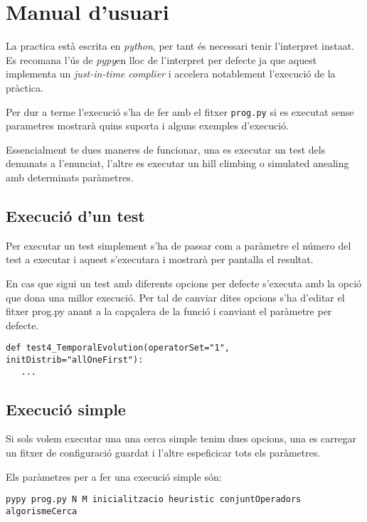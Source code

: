 \section{Manual d'usuari}

La practica està escrita en \emph{python}\footnotemark, per tant és necessari tenir
l'interpret insta\lgem at.
Es recomana l'ús de \emph{pypy}\footnotemark en lloc de l'interpret per defecte ja 
que aquest implementa un \emph{just-in-time complier} i accelera notablement l'execució
de la pràctica.

Per dur a terme l'execució s'ha de fer amb el fitxer \texttt{prog.py} si es executat
sense parametres mostrarà quins suporta i alguns exemples d'execució.

Essencialment te dues maneres de funcionar, una es executar un test dels demanats a l'enunciat,
l'altre es executar un hill climbing o simulated anealing amb determinats paràmetres.

\subsection{Execució d'un test}
Per executar un test simplement s'ha de passar com a paràmetre el número del test a executar i 
aquest s'executara i mostrarà per pantalla el resultat.

En cas que sigui un test amb diferents opcions per defecte s'executa amb la opció que dona
una millor execució. Per tal de canviar dites opcions s'ha d'editar el fitxer prog.py anant
a la capçalera de la funció i canviant el paràmetre per defecte.

\begin{verbatim}
def test4_TemporalEvolution(operatorSet="1", initDistrib="allOneFirst"):
   ...
\end{verbatim}

\subsection{Execució simple}
Si sols volem executar una una cerca simple tenim dues opcions, una es carregar un fitxer de configuració
guardat i l'altre espeficicar tots els paràmetres.

Els paràmetres per a fer una execució simple són:

\begin{verbatim}
pypy prog.py N M inicialitzacio heuristic conjuntOperadors algorismeCerca
\end{verbatim}

